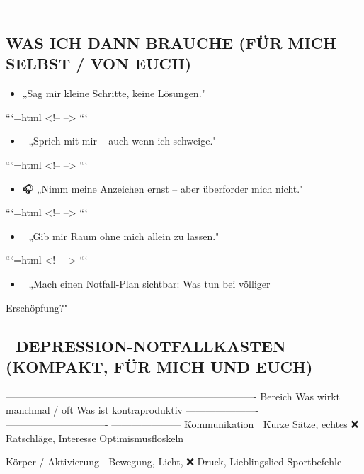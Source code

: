 -----------------------------------------------------------------------------------------------------------

\subsection{\textcolor{ctmmOrange}{} WAS ICH DANN BRAUCHE (FÜR MICH SELBST / VON EUCH)}

\begin{itemize}
\item   \textcolor{ctmmPurple}{} „Sag mir kleine Schritte, keine Lösungen."
\end{itemize}

```{=html}
<!-- -->
```
\begin{itemize}
\item   💬 „Sprich mit mir -- auch wenn ich schweige."
\end{itemize}

```{=html}
<!-- -->
```
\begin{itemize}
\item   🎧 „Nimm meine Anzeichen ernst -- aber überforder mich nicht."
\end{itemize}

```{=html}
<!-- -->
```
\begin{itemize}
\item   🧍 „Gib mir Raum ohne mich allein zu lassen."
\end{itemize}

```{=html}
<!-- -->
```
\begin{itemize}
\item   📎 „Mach einen Notfall-Plan sichtbar: Was tun bei völliger
\end{itemize}
Erschöpfung?"

\subsection{🧰 DEPRESSION-NOTFALLKASTEN (KOMPAKT, FÜR MICH UND EUCH)}

----------------------------------------------------------------------------
Bereich                Was wirkt manchmal / oft        Was ist
kontraproduktiv
---------------------- ------------------------------- ---------------------
Kommunikation          💬 Kurze Sätze, echtes          ❌ Ratschläge,
Interesse                       Optimismusfloskeln

Körper / Aktivierung   🚶 Bewegung, Licht,             ❌ Druck,
Lieblingslied                   Sportbefehle

